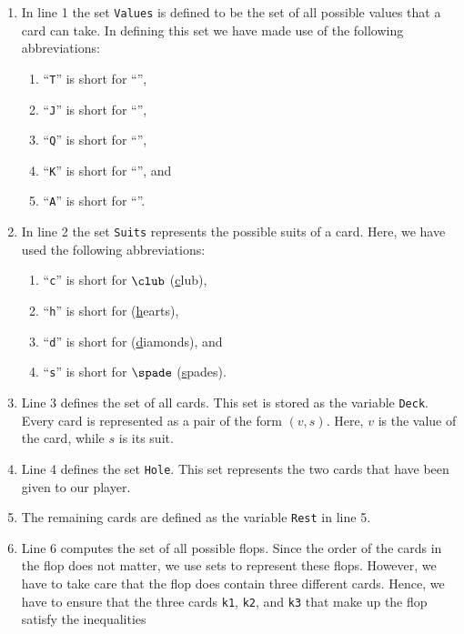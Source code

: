\begin{enumerate}
\item In line 1 the set \texttt{Values} is defined to be the set of all possible values that a card
      can take.  In defining this set we have made use of the following abbreviations:
      \begin{enumerate}
      \item ``\texttt{T}'' is short for ``'',
      \item ``\texttt{J}'' is short for ``'',
      \item ``\texttt{Q}'' is short for ``'',
      \item ``\texttt{K}'' is short for ``'', and
      \item ``\texttt{A}'' is short for ``''.
      \end{enumerate}
\item In line 2 the set \texttt{Suits} represents the possible suits of a card.  Here, we have used
      the following abbreviations:
      \begin{enumerate}
      \item ``\texttt{c}'' is short for $\club$ (\underline{c}lub), 
      \item ``\texttt{h}'' is short for \mbox{\color{red}{$\heart$}} (\underline{h}earts), 
      \item ``\texttt{d}'' is short for \mbox{\color{red}{$\diamondsuit$}} (\underline{d}iamonds), and 
      \item ``\texttt{s}'' is short for $\spade$ (\underline{s}pades). 
      \end{enumerate} 
\item Line 3 defines the set of all cards.  This set is stored as the variable \texttt{Deck}.  Every
      card is represented as a pair of the form $(v,s)$. Here, $v$ is the value of the card, while $s$ is its suit.
\item Line 4 defines the set \texttt{Hole}.  This set represents the two cards that have been given to our player.
\item The remaining cards are defined as the variable  \texttt{Rest} in line 5.
\item Line 6 computes the set of all possible flops.  Since the order of the cards in the flop does
      not matter, we use sets to represent these flops.  However, we have to take care that the flop
      does contain three \colorbox{amethyst}{different} cards.  Hence, we have to ensure that the three
      cards \texttt{k1}, \texttt{k2}, and \texttt{k3} that make up the flop satisfy the inequalities 

\end{enumerate}
